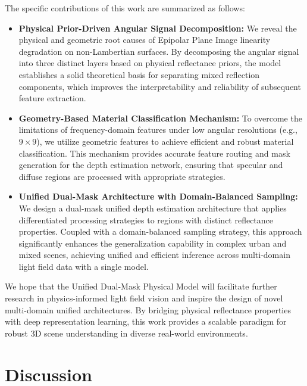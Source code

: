 \documentclass[lettersize,journal]{IEEEtran}
\begin{document}
The specific contributions of this work are summarized as follows:
\begin{itemize}
    \item \textbf{Physical Prior-Driven Angular Signal Decomposition:} We reveal the physical and geometric root causes of Epipolar Plane Image linearity degradation on non-Lambertian surfaces. By decomposing the angular signal into three distinct layers based on physical reflectance priors, the model establishes a solid theoretical basis for separating mixed reflection components, which improves the interpretability and reliability of subsequent feature extraction.
    \item \textbf{Geometry-Based Material Classification Mechanism:} To overcome the limitations of frequency-domain features under low angular resolutions (e.g., $9 \times 9$), we utilize geometric features to achieve efficient and robust material classification. This mechanism provides accurate feature routing and mask generation for the depth estimation network, ensuring that specular and diffuse regions are processed with appropriate strategies.
    \item \textbf{Unified Dual-Mask Architecture with Domain-Balanced Sampling:} We design a dual-mask unified depth estimation architecture that applies differentiated processing strategies to regions with distinct reflectance properties. Coupled with a domain-balanced sampling strategy, this approach significantly enhances the generalization capability in complex urban and mixed scenes, achieving unified and efficient inference across multi-domain light field data with a single model.
\end{itemize}

We hope that the Unified Dual-Mask Physical Model will facilitate further research in physics-informed light field vision and inspire the design of novel multi-domain unified architectures. By bridging physical reflectance properties with deep representation learning, this work provides a scalable paradigm for robust 3D scene understanding in diverse real-world environments.

\section{Discussion}
\end{document}
